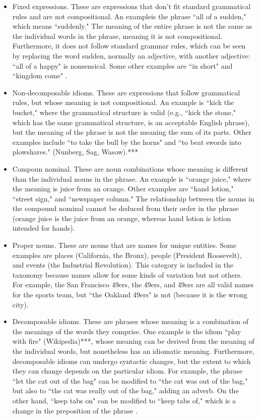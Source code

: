 \documentclass[11pt]{article}
\begin{document}
\begin{itemize}
\item Fixed expressions. These are expressions that don't fit standard grammatical rules and are not compositional. An exampleis the phrase ``all of a sudden," which means ``suddenly." The meaning of the entire phrase is not the same as the individual words in the phrase, meaning it is not compositional. Furthermore, it does not follow standard grammar rules, which can be seen by replacing the word sudden, normally an adjective, with another adjective: ``all of a happy" is nonsensical. Some other examples are ``in short" and ``kingdom come" \cite{Sag2002}.

\item Non-decomposable idioms. These are expressions that follow grammatical rules, but whose meaning is not compositional. An example is ``kick the bucket," where the grammatical structure is valid (e.g., ``kick the stone," which has the same grammatical structure, is an acceptable English phrase), but the meaning of the phrase is not the meaning the sum of its parts. Other examples include ``to take the bull by the horns" and ``to beat swords into plowshares." (Nunberg, Sag, Wasow).***

\item Compoun nominal. These are noun combinations whose meaning is different than the individual nouns in the phrase. An example is ``orange juice," where the meaning is juice from an orange. Other examples are ``hand lotion," ``street sign," and ``newspaper column." The relationship between the nouns in the compound nominal cannot be deduced from their order in the phrase (orange juice is the juice from an orange, whereas hand lotion is lotion intended for hands).

\item Proper nouns. These are nouns that are names for unique entities. Some examples are places (California, the Bronx), people (President Roosevelt), and events (the Industrial Revolution). This category is included in the taxonomy because names allow for some kinds of variation but not others. For example, the San Francisco 49ers, the 49ers, and 49ers are all valid names for the sports team, but ``the Oakland 49ers" is not (because it is the wrong city).

\item Decomposable idioms. These are phrases whose meaning is a combination of the meanings of the words they comprise. One example is the idiom ``play with fire" (Wikipedia)***, whose meaning can be derived from the meaning of the individual words, but nonetheless has an idiomatic meaning. Furthermore, decomposable idioms can undergo syntactic changes, but the extent to which they can change depends on the particular idiom. For example, the phrase ``let the cat out of the bag" can be modified to ``the cat was out of the bag," but also to ``the cat was really out of the bag," adding an adverb. On the other hand, ``keep tabs on" can be modified to ``keep tabs of,"  which is a change in the preposition of the phrase \cite{Riehemann01aconstructional}. 


\end{itemize}
\end{document}
